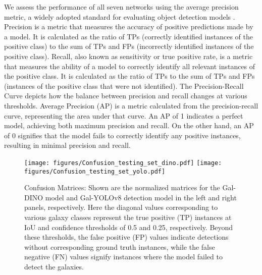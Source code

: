 \documentclass[
  journal=pasa,
  manuscript=research-paper, %
  year=2020,
  volume=37,
]{cup-journal}
\begin{document}
We assess the performance of all seven networks using the average precision metric, a widely adopted standard for evaluating object detection models \citep[][]{coco14}. 
Precision is a metric that measures the accuracy of positive predictions made by a model. It is calculated as the ratio of TPs (correctly identified instances of the positive class) to the sum of TPs and FPs (incorrectly identified instances of the positive class). 
Recall, also known as sensitivity or true positive rate, is a metric that measures the ability of a model to correctly identify all relevant instances of the positive class. It is calculated as the ratio of TPs to the sum of TPs and FPs (instances of the positive class that were not identified).  
The Precision-Recall Curve depicts how the balance between precision and recall changes at various thresholds.
Average Precision (AP) is a metric calculated from the precision-recall curve, representing the area under that curve. 
An AP of 1 indicates a perfect model, achieving both maximum precision and recall. 
On the other hand, an AP of 0 signifies that the model fails to correctly identify any positive instances, resulting in minimal precision and recall.

\begin{figure*}
\centering
\texttt{[image: figures/Confusion\_testing\_set\_dino.pdf]}
\texttt{[image: figures/Confusion\_testing\_set\_yolo.pdf]}
\caption{Confusion Matrices: Shown are the normalized matrices for the Gal-DINO model and Gal-YOLOv8 detection model in the left and right panels, respectively. 
Here the diagonal values corresponding to various galaxy classes represent the true positive (TP) instances at IoU and confidence thresholds of 0.5 and 0.25, respectively. Beyond these thresholds, the false positive (FP) values indicate detections without corresponding ground truth instances, while the false negative (FN) values signify instances where the model failed to detect the galaxies.
} 
\label{FIG:Confusion}
\end{figure*}
\end{document}
